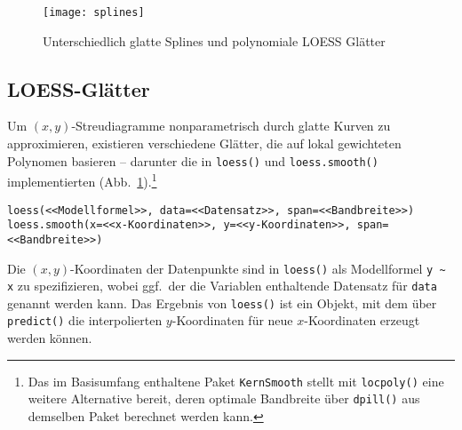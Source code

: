 \begin{figure}[ht]
\centering
\texttt{[image: splines]}
\vspace*{-1.5em}
\caption{Unterschiedlich glatte Splines und polynomiale LOESS Glätter}
\label{fig:splines}
\end{figure}

\subsection{LOESS-Glätter}
\label{sec:loess}

Um $(x, y)$-Streudiagramme nonparametrisch durch glatte Kurven zu approximieren, existieren verschiedene Glätter, die auf lokal gewichteten Polynomen basieren -- darunter die in \lstinline!loess()! und \lstinline!loess.smooth()! implementierten (Abb.\ \ref{fig:splines}).\footnote{Das im Basisumfang enthaltene Paket \lstinline!KernSmooth! \cite{Wand2013} stellt mit \lstinline!locpoly()! eine weitere Alternative bereit, deren optimale Bandbreite über \lstinline!dpill()! aus demselben Paket berechnet werden kann.}
\begin{lstlisting}
loess(<<Modellformel>>, data=<<Datensatz>>, span=<<Bandbreite>>)
loess.smooth(x=<<x-Koordinaten>>, y=<<y-Koordinaten>>, span=<<Bandbreite>>)
\end{lstlisting}

Die $(x, y)$-Koordinaten der Datenpunkte sind in \lstinline!loess()! als Modellformel \lstinline!y ~ x! zu spezifizieren, wobei ggf.\ der die Variablen enthaltende Datensatz für \lstinline!data! genannt werden kann. Das Ergebnis von \lstinline!loess()! ist ein Objekt, mit dem über \lstinline!predict()! die interpolierten $y$-Koordinaten für neue $x$-Koordinaten erzeugt werden können.

